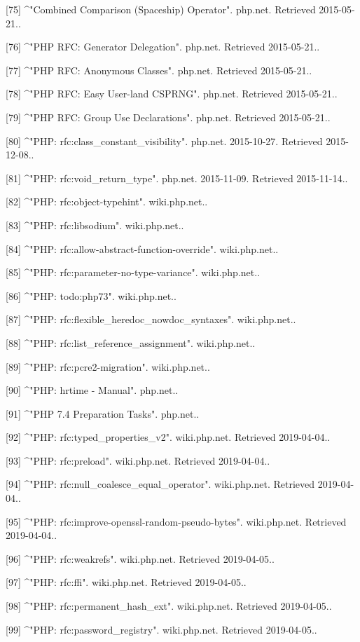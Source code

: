 [75]
^"Combined Comparison (Spaceship) Operator". php.net. Retrieved 2015-05-21..

[76]
^"PHP RFC: Generator Delegation". php.net. Retrieved 2015-05-21..

[77]
^"PHP RFC: Anonymous Classes". php.net. Retrieved 2015-05-21..

[78]
^"PHP RFC: Easy User-land CSPRNG". php.net. Retrieved 2015-05-21..

[79]
^"PHP RFC: Group Use Declarations". php.net. Retrieved 2015-05-21..

[80]
^"PHP: rfc:class_constant_visibility". php.net. 2015-10-27. Retrieved 2015-12-08..

[81]
^"PHP: rfc:void_return_type". php.net. 2015-11-09. Retrieved 2015-11-14..

[82]
^"PHP: rfc:object-typehint". wiki.php.net..

[83]
^"PHP: rfc:libsodium". wiki.php.net..

[84]
^"PHP: rfc:allow-abstract-function-override". wiki.php.net..

[85]
^"PHP: rfc:parameter-no-type-variance". wiki.php.net..

[86]
^"PHP: todo:php73". wiki.php.net..

[87]
^"PHP: rfc:flexible_heredoc_nowdoc_syntaxes". wiki.php.net..

[88]
^"PHP: rfc:list_reference_assignment". wiki.php.net..

[89]
^"PHP: rfc:pcre2-migration". wiki.php.net..

[90]
^"PHP: hrtime - Manual". php.net..

[91]
^"PHP 7.4 Preparation Tasks". php.net..

[92]
^"PHP: rfc:typed_properties_v2". wiki.php.net. Retrieved 2019-04-04..

[93]
^"PHP: rfc:preload". wiki.php.net. Retrieved 2019-04-04..

[94]
^"PHP: rfc:null_coalesce_equal_operator". wiki.php.net. Retrieved 2019-04-04..

[95]
^"PHP: rfc:improve-openssl-random-pseudo-bytes". wiki.php.net. Retrieved 2019-04-04..

[96]
^"PHP: rfc:weakrefs". wiki.php.net. Retrieved 2019-04-05..

[97]
^"PHP: rfc:ffi". wiki.php.net. Retrieved 2019-04-05..

[98]
^"PHP: rfc:permanent_hash_ext". wiki.php.net. Retrieved 2019-04-05..

[99]
^"PHP: rfc:password_registry". wiki.php.net. Retrieved 2019-04-05..

